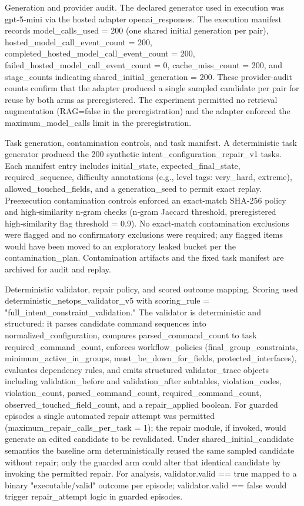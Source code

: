\documentclass[conference]{IEEEtran}
\begin{document}
Generation and provider audit. The declared generator used in execution was gpt‑5‑mini via the hosted adapter openai\_responses. The execution manifest records model\_calls\_used = 200 (one shared initial generation per pair), hosted\_model\_call\_event\_count = 200, completed\_hosted\_model\_call\_event\_count = 200, failed\_hosted\_model\_call\_event\_count = 0, cache\_miss\_count = 200, and stage\_counts indicating shared\_initial\_generation = 200. These provider‑audit counts confirm that the adapter produced a single sampled candidate per pair for reuse by both arms as preregistered. The experiment permitted no retrieval augmentation (RAG=false in the preregistration) and the adapter enforced the maximum\_model\_calls limit in the preregistration.

Task generation, contamination controls, and task manifest. A deterministic task generator produced the 200 synthetic intent\_configuration\_repair\_v1 tasks. Each manifest entry includes initial\_state, expected\_final\_state, required\_sequence, difficulty annotations (e.g., level tags: very\_hard, extreme), allowed\_touched\_fields, and a generation\_seed to permit exact replay. Preexecution contamination controls enforced an exact‑match SHA‑256 policy and high‑similarity n‑gram checks (n‑gram Jaccard threshold, preregistered high‑similarity flag threshold = 0.9). No exact‑match contamination exclusions were flagged and no confirmatory exclusions were required; any flagged items would have been moved to an exploratory leaked bucket per the contamination\_plan. Contamination artifacts and the fixed task manifest are archived for audit and replay.

Deterministic validator, repair policy, and scored outcome mapping. Scoring used deterministic\_netops\_validator\_v5 with scoring\_rule = "full\_intent\_constraint\_validation." The validator is deterministic and structured: it parses candidate command sequences into normalized\_configuration, compares parsed\_command\_count to task required\_command\_count, enforces workflow\_policies (final\_group\_constraints, minimum\_active\_in\_groups, must\_be\_down\_for\_fields, protected\_interfaces), evaluates dependency rules, and emits structured validator\_trace objects including validation\_before and validation\_after subtables, violation\_codes, violation\_count, parsed\_command\_count, required\_command\_count, observed\_touched\_field\_count, and a repair\_applied boolean. For guarded episodes a single automated repair attempt was permitted (maximum\_repair\_calls\_per\_task = 1); the repair module, if invoked, would generate an edited candidate to be revalidated. Under shared\_initial\_candidate semantics the baseline arm deterministically reused the same sampled candidate without repair; only the guarded arm could alter that identical candidate by invoking the permitted repair. For analysis, validator.valid == true mapped to a binary "executable/valid" outcome per episode; validator.valid == false would trigger repair\_attempt logic in guarded episodes.
\end{document}
